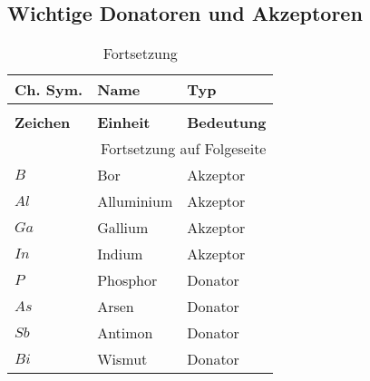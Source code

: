 \documentclass[12pt,a4paper]{report}%
\numberwithin{equation}{section}
\begin{document}
	\subsection{Wichtige Donatoren und Akzeptoren} \label{ch:don/acc}
	\renewcommand{\arraystretch}{1.5}
	\begin{longtable} {|p{2cm}|p{3cm}|p{8.4cm}|} \hline
	\textbf{Ch. Sym.} & \textbf{Name} & \textbf{Typ} \\
	\hline
	\endfirsthead %
	\caption{Fortsetzung}\\ \hline
	\textbf{Zeichen} & \textbf{Einheit} & \textbf{Bedeutung} \\
	\hline
	\endhead %
	\multicolumn{3}{r}{Fortsetzung auf Folgeseite}\\
	\endfoot
	\hline
	\endlastfoot
	$B$ & Bor & Akzeptor \\ \hline
	$Al$ & Alluminium & Akzeptor \\ \hline
	$Ga$ & Gallium & Akzeptor \\ \hline
	$In$ & Indium & Akzeptor \\ \hline
	$P$ & Phosphor & Donator \\ \hline
	$As$ & Arsen & Donator \\ \hline
	$Sb$ & Antimon & Donator \\ \hline
	$Bi$ & Wismut & Donator \\ \hline
	\end{longtable}
	\renewcommand{\arraystretch}{1}
	
\end{document}
